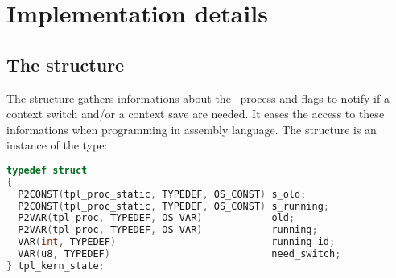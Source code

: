 
\chapter{Implementation details}

\section{The  structure}

The  structure gathers informations about the \RUNNING\ process and flags to notify if a context switch and/or a context save are needed. It eases the access to these informations when programming in assembly language. The  structure is an instance of the  type:

\begin{lstlisting}[language=C]
typedef struct 
{
  P2CONST(tpl_proc_static, TYPEDEF, OS_CONST) s_old;
  P2CONST(tpl_proc_static, TYPEDEF, OS_CONST) s_running;
  P2VAR(tpl_proc, TYPEDEF, OS_VAR)            old;
  P2VAR(tpl_proc, TYPEDEF, OS_VAR)            running;
  VAR(int, TYPEDEF)                           running_id;
  VAR(u8, TYPEDEF)                            need_switch;
} tpl_kern_state;
\end{lstlisting}